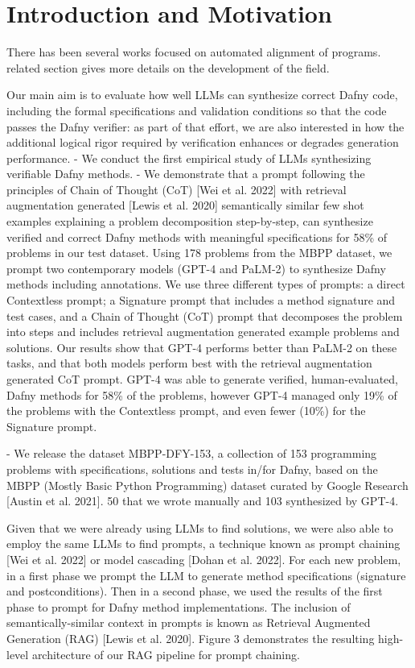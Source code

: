 \documentclass[12pt,letterpaper]{article}
\begin{document}
\section{Introduction and Motivation}
\label{sec:intro}


There has been several works focused on automated alignment of programs.
\cite{naumann_isola_2020} related section gives more details on
the development of the field.

\cite{misu_2024_fse} Our main aim is to evaluate how well LLMs can synthesize
correct Dafny code, including the formal specifications and validation
conditions so that the code passes the Dafny verifier: as part of that effort,
we are also interested in how the additional logical rigor required by
verification enhances or degrades generation performance. 
- We conduct the first empirical study of LLMs synthesizing verifiable Dafny methods.
- We demonstrate that a prompt following the principles of Chain of Thought (CoT) [Wei
et al. 2022] with retrieval augmentation generated [Lewis et al. 2020] semantically similar few shot examples explaining a problem decomposition step-by-step, can synthesize
verified and correct Dafny methods with meaningful specifications for 58\% of problems
in our test dataset.
Using 178 problems from the MBPP dataset, we prompt two contemporary models
(GPT-4 and PaLM-2) to synthesize Dafny methods including annotations. We use
three different types of prompts: a direct Contextless prompt; a Signature
prompt that includes a method signature and test cases, and a Chain of Thought
(CoT) prompt that decomposes the problem into steps and includes retrieval
augmentation generated example problems and solutions. Our results show that
GPT-4 performs better than PaLM-2 on these tasks, and that both models perform
best with the retrieval augmentation generated CoT prompt. GPT-4 was able to
generate verified, human-evaluated, Dafny methods for 58\% of the problems,
however GPT-4 managed only 19\% of the problems with the Contextless prompt, and
even fewer (10\%) for the Signature prompt. 

- We release the dataset MBPP-DFY-153, a collection of 153 programming problems
with specifications, solutions and tests in/for Dafny, based on the MBPP (Mostly Basic
Python Programming) dataset curated by Google Research [Austin et al. 2021].
50 that we wrote manually and 103 synthesized by GPT-4. 

Given that we were already using LLMs to find solutions, we were also able to
employ the same LLMs to find prompts, a technique known as prompt chaining [Wei
et al. 2022] or model cascading [Dohan et al. 2022]. For each new problem, in a
first phase we prompt the LLM to generate method specifications (signature and
postconditions). Then in a second phase, we used the results of the first phase
to prompt for Dafny method implementations. The inclusion of
semantically-similar context in prompts is known as Retrieval Augmented
Generation (RAG) [Lewis et al. 2020]. Figure 3 demonstrates the resulting
high-level architecture of our RAG pipeline for prompt chaining.
\end{document}
